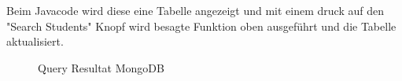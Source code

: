 \newpage
Beim Javacode wird diese eine Tabelle angezeigt und mit einem druck auf den "Search Students" Knopf wird besagte Funktion oben ausgeführt und die Tabelle aktualisiert. 

\begin{figure}[h]
	\centering
	\caption{Query Resultat MongoDB \cite{Kaufmann2016}}
	\label{fig:monogdbres}
\end{figure}
